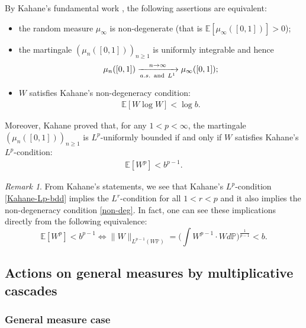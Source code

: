 \documentclass[12pt]{amsart}
\theoremstyle{definition}
\theoremstyle{remark}
\newtheorem{remark}{Remark}[section]
\newcommand{\E}{\mathbb{E}}
\newcommand{\PP}{\mathbb{P}}
\newcommand{\an}{\text{\, and \,}}
\numberwithin{equation}{section}
\begin{document}
By  Kahane's fundamental  work \cite{Kahane-Peyriere-advance}, the following assertions are equivalent: 
\begin{itemize}
\item[(i)] the random measure $\mu_\infty$ is non-degenerate (that is $\E[\mu_\infty([0,1])] >0$);
\item[(ii)] the martingale  $(\mu_n([0,1]))_{n\ge 1}$ is uniformly integrable and hence 
\[
\mu_n([0,1])\xrightarrow[a.s. \an  L^1]{n\to\infty} \mu_\infty([0,1]);
\]
\item[(iii)] $W$ satisfies Kahane's non-degeneracy condition:
\begin{align}\label{non-deg}
\E[W\log W] <\log b.
\end{align}
\end{itemize}
Moreover,  Kahane \cite{Kahane-Peyriere-advance} proved that, for any $1<p<\infty$,  the martingale $(\mu_n([0,1]))_{n\ge 1}$ is $L^p$-uniformly bounded if and only if $W$ satisfies Kahane's $L^p$-condition:
\begin{align}\label{Kahane-Lp-bdd} 
\E[W^p]<b^{p-1}. 
\end{align}

\begin{remark}\label{rem-Lp-non-deg}
From Kahane's statements, we see that Kahane's $L^p$-condition \eqref{Kahane-Lp-bdd}  implies the $L^r$-condition for all $1<r<p$ and it also implies  the non-degeneracy condition \eqref{non-deg}.   In fact, one can see these implications directly from the following equivalence: 
\[
\E[W^p]<b^{p-1} \Longleftrightarrow \|W\|_{L^{p-1}(W \PP)} = \Big( \int  W^{p-1} \cdot Wd\PP\Big)^{\frac{1}{p-1}} <b.
\]
\end{remark}





\subsection{Actions on general measures by multiplicative cascades}


\subsubsection{General measure case}\label{sec-g-m}
\end{document}
